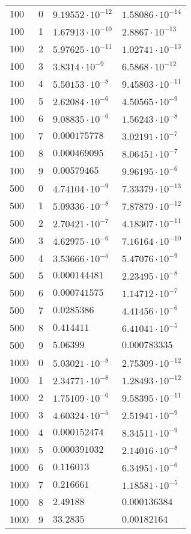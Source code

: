 \documentclass[english]{article}
\begin{document}
\begin{center}
\begin{longtable}{l|l|l|l}
    \hline
    100 & 0 & \(9.19552\cdot 10^{-12}\) & \(1.58086\cdot 10^{-14}\) \\
    100 & 1 & \(1.67913\cdot 10^{-10}\) & \(2.8867\cdot 10^{-13}\) \\
    100 & 2 & \(5.97625\cdot 10^{-11}\) & \(1.02741\cdot 10^{-13}\) \\
    100 & 3 & \(3.8314\cdot 10^{-9}\) & \(6.5868\cdot 10^{-12}\) \\
    100 & 4 & \(5.50153\cdot 10^{-8}\) & \(9.45803\cdot 10^{-11}\) \\
    100 & 5 & \(2.62084\cdot 10^{-6}\) & \(4.50565\cdot 10^{-9}\) \\
    100 & 6 & \(9.08835\cdot 10^{-6}\) & \(1.56243\cdot 10^{-8}\) \\
    100 & 7 & \(0.000175778\) & \(3.02191\cdot 10^{-7}\) \\
    100 & 8 & \(0.000469095\) & \(8.06451\cdot 10^{-7}\) \\
    100 & 9 & \(0.00579465\) & \(9.96195\cdot 10^{-6}\) \\
    \hline
    500 & 0 & \(4.74104\cdot 10^{-9}\) & \(7.33379\cdot 10^{-13}\) \\
    500 & 1 & \(5.09336\cdot 10^{-8}\) & \(7.87879\cdot 10^{-12}\) \\
    500 & 2 & \(2.70421\cdot 10^{-7}\) & \(4.18307\cdot 10^{-11}\) \\
    500 & 3 & \(4.62975\cdot 10^{-6}\) & \(7.16164\cdot 10^{-10}\) \\
    500 & 4 & \(3.53666\cdot 10^{-5}\) & \(5.47076\cdot 10^{-9}\) \\
    500 & 5 & \(0.000144481\) & \(2.23495\cdot 10^{-8}\) \\
    500 & 6 & \(0.000741575\) & \(1.14712\cdot 10^{-7}\) \\
    500 & 7 & \(0.0285386\) & \(4.41456\cdot 10^{-6}\) \\
    500 & 8 & \(0.414411\) & \(6.41041\cdot 10^{-5}\) \\
    500 & 9 & \(5.06399\) & \(0.000783335\) \\
    \hline
    1000 & 0 & \(5.03021\cdot 10^{-8}\) & \(2.75309\cdot 10^{-12}\) \\
    1000 & 1 & \(2.34771\cdot 10^{-8}\) & \(1.28493\cdot 10^{-12}\) \\
    1000 & 2 & \(1.75109\cdot 10^{-6}\) & \(9.58395\cdot 10^{-11}\) \\
    1000 & 3 & \(4.60324\cdot 10^{-5}\) & \(2.51941\cdot 10^{-9}\) \\
    1000 & 4 & \(0.000152474\) & \(8.34511\cdot 10^{-9}\) \\
    1000 & 5 & \(0.000391032\) & \(2.14016\cdot 10^{-8}\) \\
    1000 & 6 & \(0.116013\) & \(6.34951\cdot 10^{-6}\) \\
    1000 & 7 & \(0.216661\) & \(1.18581\cdot 10^{-5}\) \\
    1000 & 8 & \(2.49188\) & \(0.000136384\) \\
    1000 & 9 & \(33.2835\) & \(0.00182164\)
  \end{longtable}
\end{center}
\end{document}
